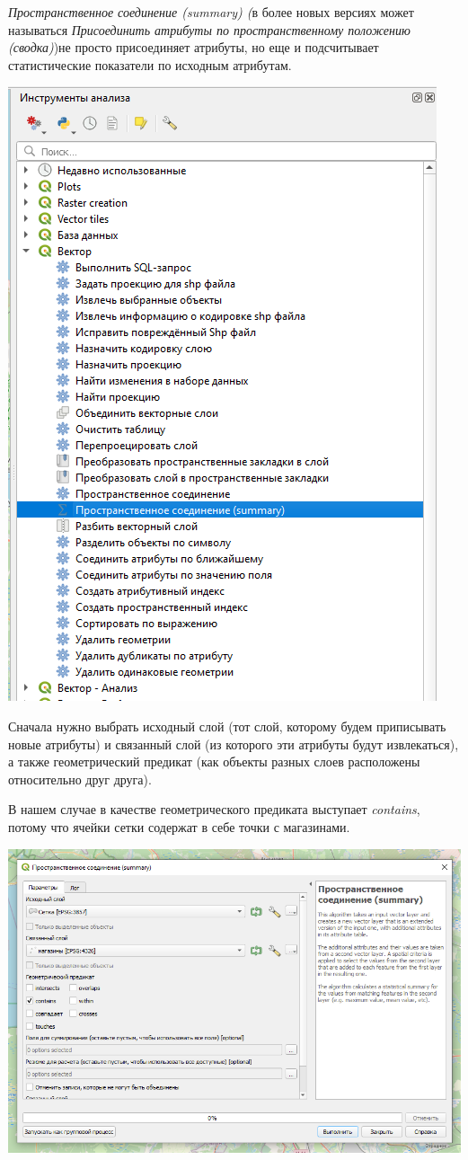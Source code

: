 \documentclass[
]{book}
\begin{document}
\emph{Пространственное соединение (summary) (}в более новых версиях может называться \emph{Присоединить атрибуты по пространственному положению (сводка)})не просто присоединяет атрибуты, но еще и подсчитывает статистические показатели по исходным атрибутам.

\includegraphics{figures/17.png}

Сначала нужно выбрать исходный слой (тот слой, которому будем приписывать новые атрибуты) и связанный слой (из которого эти атрибуты будут извлекаться), а также геометрический предикат (как объекты разных слоев расположены относительно друг друга).

В нашем случае в качестве геометрического предиката выступает \emph{contains}, потому что ячейки сетки содержат в себе точки с магазинами.

\includegraphics{figures/18.png}
\end{document}
